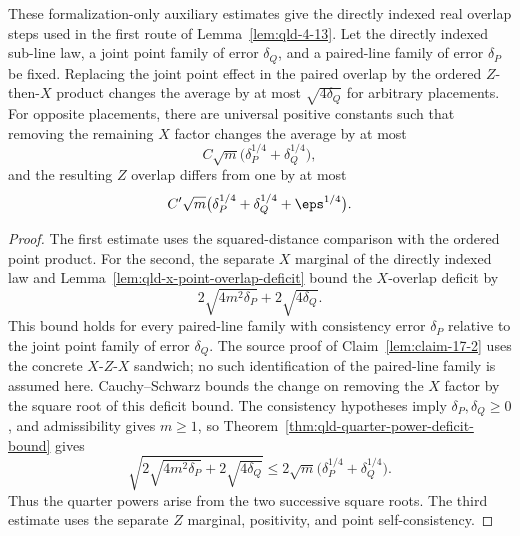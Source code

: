 \begin{lemma}
	\label{lem:paired-subline-overlap-estimates}
	\leanok
	These formalization-only auxiliary estimates give the directly indexed real
	overlap steps used in the first route of Lemma~\ref{lem:qld-4-13}. Let the
	directly indexed sub-line law, a joint point family of error
	$\delta_Q$, and a paired-line family of error $\delta_P$ be fixed. Replacing
	the joint point effect in the paired overlap by the ordered $Z$-then-$X$
	product changes the average by at most $\sqrt{4\delta_Q}$ for arbitrary
	placements. For opposite placements, there are universal positive constants
	such that removing the remaining $X$ factor changes the average by at most
	\[
		C\sqrt m\bigl(\delta_P^{1/4}+\delta_Q^{1/4}\bigr),
	\]
	and the resulting $Z$ overlap differs from one by at most
	\[
		C'\sqrt m\bigl(\delta_P^{1/4}+\delta_Q^{1/4}+\eps^{1/4}\bigr).
	\]
\end{lemma}
\begin{proof}
	\leanok
	The first estimate uses the squared-distance comparison with the ordered point
	product. For the second, the separate $X$ marginal of the directly indexed law
	and Lemma~\ref{lem:qld-x-point-overlap-deficit} bound the $X$-overlap deficit by
	\[
		2\sqrt{4m^2\delta_P}+2\sqrt{4\delta_Q}.
	\]
	This bound holds for every paired-line family with consistency error
	$\delta_P$ relative to the joint point family of error $\delta_Q$.
	The source proof of Claim~\ref{lem:claim-17-2} uses the concrete
	$X$-$Z$-$X$ sandwich; no such identification of the paired-line family is
	assumed here. Cauchy--Schwarz bounds the change on removing the $X$ factor
	by the square root of this deficit bound. The consistency hypotheses imply
	$\delta_P,\delta_Q\geq0$, and admissibility gives $m\geq1$, so
	Theorem~\ref{thm:qld-quarter-power-deficit-bound} gives
	\[
		\sqrt{2\sqrt{4m^2\delta_P}+2\sqrt{4\delta_Q}}
		\leq 2\sqrt m\bigl(\delta_P^{1/4}+\delta_Q^{1/4}\bigr).
	\]
	Thus the quarter powers arise from the two successive square roots.
	The third estimate uses the separate $Z$ marginal, positivity, and point
	self-consistency.
\end{proof}

